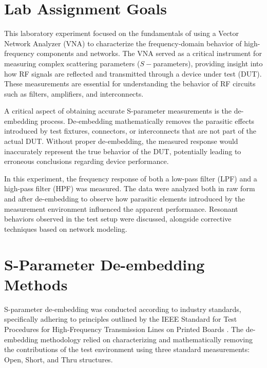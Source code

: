
\singlespacing
	
\section{Lab Assignment Goals}
\justifying
This laboratory experiment focused on the fundamentals of using a Vector Network Analyzer (VNA) to characterize the frequency-domain behavior of high-frequency components and networks. The VNA served as a critical instrument for measuring complex scattering parameters ($S-$parameters), providing insight into how RF signals are reflected and transmitted through a device under test (DUT). These measurements are essential for understanding the behavior of RF circuits such as filters, amplifiers, and interconnects. \cite{ieee370_2011}

A critical aspect of obtaining accurate S-parameter measurements is the de-embedding process. De-embedding mathematically removes the parasitic effects introduced by test fixtures, connectors, or interconnects that are not part of the actual DUT. Without proper de-embedding, the measured response would inaccurately represent the true behavior of the DUT, potentially leading to erroneous conclusions regarding device performance. \cite{nan2007dummyfills}

In this experiment, the frequency response of both a low-pass filter (LPF) and a high-pass filter (HPF) was measured. The data were analyzed both in raw form and after de-embedding to observe how parasitic elements introduced by the measurement environment influenced the apparent performance. Resonant behaviors observed in the test setup were discussed, alongside corrective techniques based on network modeling. \cite{amakawa2015comparative}

\section{S-Parameter De-embedding Methods}
\justifying

S-parameter de-embedding was conducted according to industry standards, specifically adhering to principles outlined by the IEEE Standard for Test Procedures for High-Frequency Transmission Lines on Printed Boards \cite{ieee370_2020}. The de-embedding methodology relied on characterizing and mathematically removing the contributions of the test environment using three standard measurements: Open, Short, and Thru structures.

